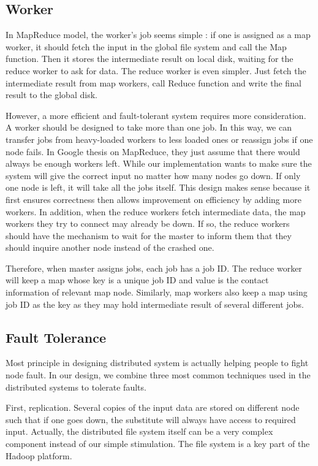 \documentclass[12pt]{article}
\begin{document}
\subsection{Worker}

In MapReduce model, the worker's job seems simple : if one is assigned as a map worker, it should fetch the input in the global file system and
call the Map function. Then it stores the intermediate result on local disk, waiting for the reduce worker to ask for data. The reduce worker
is even simpler. Just fetch the intermediate result from map workers, call Reduce function and write the final result to the global disk. 

However, a more efficient and fault-tolerant system requires more consideration. A worker should be designed to take more than one job. In this
way, we can transfer jobs from heavy-loaded workers to less loaded ones or reassign jobs if one node fails. In Google thesis on MapReduce, they just assume that there would always be enough workers left. While our implementation wants to make sure the system will give the correct input no matter how many nodes go down. If only one node is left, it will take all the jobs itself. This design makes sense because it first ensures correctness then allows improvement on efficiency by adding more workers.
In addition, when the reduce workers fetch intermediate data, the map workers they try to connect may already be down. If so, the reduce workers
should have the mechanism to wait for the master to inform them that they should inquire another node instead of the crashed one.

Therefore, when master assigns jobs, each job has a job ID. The reduce worker will keep a map whose key is a unique job ID and value is the contact information of relevant map node. Similarly, map workers also keep a map using job ID as the key as they may hold intermediate result of several different jobs.
    
\subsection{Fault Tolerance}

Most principle in designing distributed system is actually helping people to fight node fault. In our design, we combine three most common techniques used in the distributed systems to tolerate faults.

First, replication. Several copies of the input data are stored on different node such that if one goes down, the substitute will always have access to required input. Actually, the distributed file system itself can be a very complex component instead of our simple stimulation. The file system is a key part of the Hadoop platform.   
\end{document}
